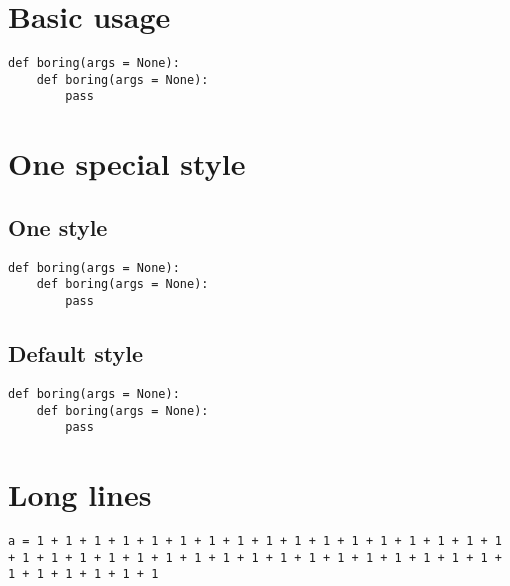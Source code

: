 \documentclass[10pt,a4paper]{article}
\begin{document}
\section{Basic usage}

\begin{verbatim}
def boring(args = None):
    def boring(args = None):
        pass
\end{verbatim}


\section{One special style}

	\subsection{One style}


\begin{verbatim}
def boring(args = None):
    def boring(args = None):
        pass
\end{verbatim}


	\subsection{Default style}


\begin{verbatim}
def boring(args = None):
    def boring(args = None):
        pass
\end{verbatim}

\section{Long lines}

\begin{verbatim}
a = 1 + 1 + 1 + 1 + 1 + 1 + 1 + 1 + 1 + 1 + 1 + 1 + 1 + 1 + 1 + 1 + 1 + 1 + 1 + 1 + 1 + 1 + 1 + 1 + 1 + 1 + 1 + 1 + 1 + 1 + 1 + 1 + 1 + 1 + 1 + 1 + 1 + 1 + 1 + 1
\end{verbatim}
\end{document}
